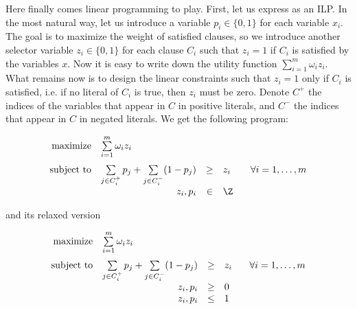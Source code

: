 \noindent
Here finally comes linear programming to play. First, let us express \maxsat as an ILP. In the most natural way,
let us introduce a variable $p_i\in\{0,1\}$ for each variable $x_i$. The goal is to maximize the 
weight of satisfied clauses, so we introduce another selector variable $z_i\in\{0,1\}$ for each clause 
$C_i$ such that
$z_i=1$ if $C_i$ is satisfied by the variables $x$. Now it is easy to write down the utility function
$\sum_{i=1}^m\omega_iz_i$. What remains now is to design the linear constraints such that $z_i=1$ only if 
$C_i$ is satisfied, i.e. if no literal of $C_i$ is true, then $z_i$ must be zero. Denote $C^+$ 
the indices of the variables that appear in $C$ in positive literals, and $C^-$ the indices that appear
in $C$ in negated literals. We get the following program:
 

\begin{equation}
\label{LP:maxsat:prog1}
\begin{array}{rrcll}
{\rm maximize}     & \multicolumn{1}{l}{ \sum\limits_{i=1}^m\omega_iz_i}\\[3ex]
{\rm subject\ to} & \sum\limits_{j\in C_i^+}p_j + \sum\limits_{j\in C_i^-}(1-p_j) &\ge&z_i& \;\;\;
                            \forall i=1,\ldots,m \\
                        & z_i,p_i&\in&\Z
\end{array}
\end{equation}

\noindent
and its relaxed version

\begin{equation}
\label{LP:maxsat:prog2}
\begin{array}{rrcll}
{\rm maximize}     & \multicolumn{1}{l}{ \sum\limits_{i=1}^m\omega_iz_i}\\[3ex]
{\rm subject\ to} & \sum\limits_{j\in C_i^+}p_j + \sum\limits_{j\in C_i^-}(1-p_j) &\ge&z_i& \;\;\;
                            \forall i=1,\ldots,m \\
                        & z_i,p_i&\ge&0\\
                        & z_i,p_i&\le&1\\
\end{array}
\end{equation}

